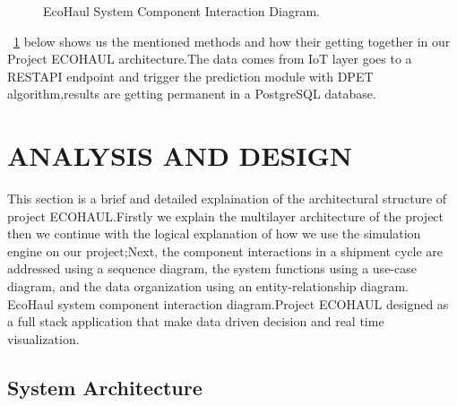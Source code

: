 \documentclass[12pt,a4paper]{report}
\begin{document}
\begin{figure}[H]
\centering
{}
\caption{EcoHaul System Component Interaction Diagram.}
\label{fig:component_interaction}
\end{figure}


\Fig~\ref{fig:component_interaction} below shows us the mentioned methods and how their getting together in our Project ECOHAUL architecture.The data comes from IoT layer goes to a RESTAPI endpoint and trigger the prediction module with DPET algorithm,results are getting permanent in a PostgreSQL database.
\chapter{ANALYSIS AND DESIGN}

\indent This section is a brief and detailed explaination of the architectural structure of project ECOHAUL.Firstly  we explain the multilayer architecture of the project then we continue with the logical explanation of how we use the simulation engine on our project;Next, the component interactions in a shipment cycle are addressed using a sequence diagram, the system functions using a use-case diagram, and the data organization using an entity-relationship diagram. EcoHaul system component interaction diagram.Project ECOHAUL designed as a full stack application that make data driven decision and real time visualization.

\section{System Architecture}
\end{document}
